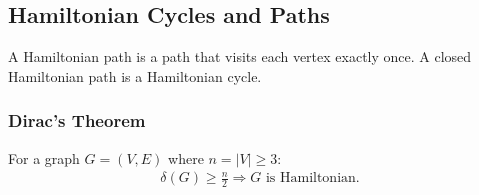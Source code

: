 \subsection{Hamiltonian Cycles and Paths}

A Hamiltonian path is a path that visits each vertex exactly once.
A closed Hamiltonian path is a Hamiltonian cycle.

\subsubsection{Dirac's Theorem}

For a graph $G = (V, E)$ where $n = |V| \geq 3$: \begin{gather*}
  \delta(G) \geq \frac{n}{2} \Rightarrow G \text{ is Hamiltonian.}
\end{gather*}